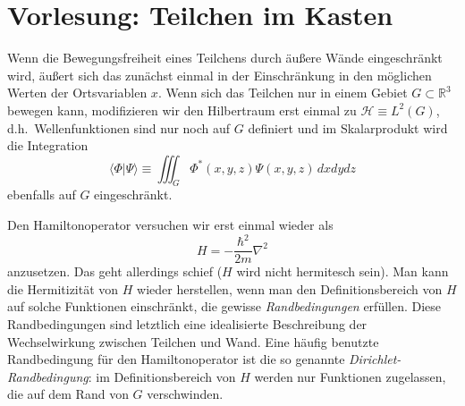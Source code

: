 
\section{Vorlesung: Teilchen im Kasten}
Wenn die Bewegungsfreiheit eines Teilchens durch äußere Wände eingeschränkt wird, äußert sich das zunächst einmal in der Einschränkung in den möglichen Werten der Ortsvariablen $x$. Wenn sich das Teilchen nur in einem Gebiet $G \subset \mathbb{R}^3$ bewegen kann, modifizieren wir den Hilbertraum erst einmal zu $\mathcal{H}\equiv L^2(G)$, d.h.\ Wellenfunktionen sind nur noch auf $G$ definiert und im
Skalarprodukt wird die Integration 
\begin{equation}
	\langle \Phi|\Psi\rangle \equiv \iiint_G \Phi^*(x,y,z)\Psi(x,y,z)\, dxdydz
\end{equation}
ebenfalls auf $G$ eingeschränkt. 

Den Hamiltonoperator versuchen wir erst einmal wieder als 
\begin{equation}
	H = -\frac{\hbar^2}{2m}\nabla^2
\end{equation}
anzusetzen. Das geht allerdings schief ($H$ wird nicht hermitesch sein). Man kann die Hermitizität von $H$ wieder herstellen, wenn man den Definitionsbereich von $H$ auf solche Funktionen einschränkt, die gewisse \emph{Randbedingungen} erfüllen. Diese Randbedingungen sind letztlich eine idealisierte Beschreibung der Wechselwirkung zwischen Teilchen und Wand. Eine häufig benutzte Randbedingung für den Hamiltonoperator ist die so genannte \emph{Dirichlet-Randbedingung}: im Definitionsbereich von $H$ werden nur Funktionen zugelassen, die auf dem Rand von $G$ verschwinden.

